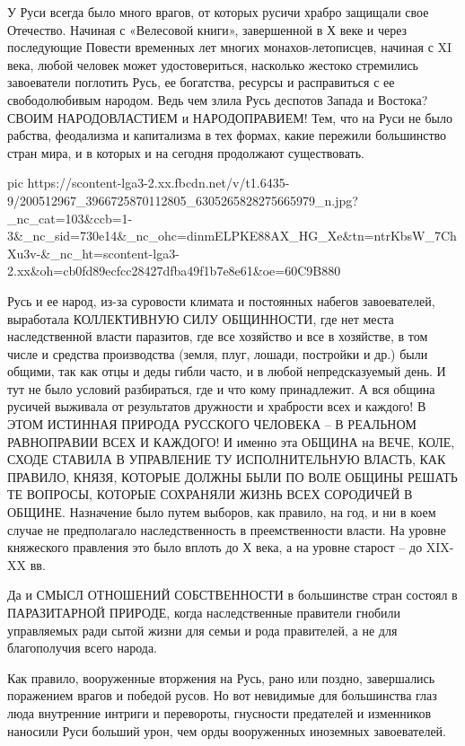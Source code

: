 У Руси всегда было много врагов, от которых русичи  храбро защищали свое
Отечество. Начиная с «Велесовой книги», завершенной в Х веке и через
последующие Повести временных лет многих монахов-летописцев, начиная с XI века,
любой человек может удостовериться, насколько жестоко стремились завоеватели
поглотить Русь, ее богатства, ресурсы и расправиться с ее свободолюбивым
народом. Ведь чем злила Русь деспотов Запада и Востока? СВОИМ НАРОДОВЛАСТИЕМ и
НАРОДОПРАВИЕМ! Тем, что на Руси не было рабства, феодализма и капитализма в тех
формах, какие пережили большинство стран мира, и в которых и на сегодня
продолжают существовать. 

\ifcmt
  pic https://scontent-lga3-2.xx.fbcdn.net/v/t1.6435-9/200512967_3966725870112805_6305265828275665979_n.jpg?_nc_cat=103&ccb=1-3&_nc_sid=730e14&_nc_ohc=dinmELPKE88AX_HG_Xe&tn=ntrKbsW_7ChXu3v-&_nc_ht=scontent-lga3-2.xx&oh=cb0fd89ecfcc28427dfba49f1b7e8e61&oe=60C9B880
\fi

Русь и ее народ, из-за суровости климата и постоянных набегов завоевателей,
выработала КОЛЛЕКТИВНУЮ СИЛУ ОБЩИННОСТИ, где нет места наследственной власти
паразитов, где все хозяйство и все в хозяйстве, в том числе и средства
производства (земля, плуг, лошади, постройки и др.) были общими, так как отцы и
деды гибли часто, и в любой непредсказуемый день. И тут не было условий
разбираться, где и что кому принадлежит. А вся община русичей выживала от
результатов дружности и храбрости всех и каждого! В ЭТОМ ИСТИННАЯ ПРИРОДА
РУССКОГО ЧЕЛОВЕКА – В РЕАЛЬНОМ РАВНОПРАВИИ ВСЕХ И КАЖДОГО! И именно эта ОБЩИНА
на ВЕЧЕ, КОЛЕ, СХОДЕ СТАВИЛА В УПРАВЛЕНИЕ ТУ ИСПОЛНИТЕЛЬНУЮ ВЛАСТЬ, КАК
ПРАВИЛО, КНЯЗЯ, КОТОРЫЕ ДОЛЖНЫ БЫЛИ ПО ВОЛЕ ОБЩИНЫ РЕШАТЬ ТЕ ВОПРОСЫ, КОТОРЫЕ
СОХРАНЯЛИ ЖИЗНЬ ВСЕХ СОРОДИЧЕЙ В ОБЩИНЕ. Назначение было путем выборов, как
правило, на год, и ни в коем случае не предполагало наследственность в
преемственности власти. На уровне княжеского правления это было вплоть до Х
века, а на уровне старост – до XIX-XX  вв.

Да и СМЫСЛ ОТНОШЕНИЙ СОБСТВЕННОСТИ в большинстве стран состоял в ПАРАЗИТАРНОЙ
ПРИРОДЕ, когда наследственные правители гнобили управляемых ради сытой жизни
для семьи и рода правителей, а не для благополучия всего народа.

Как правило, вооруженные вторжения на Русь, рано или поздно, завершались
поражением врагов и победой русов. Но вот невидимые для большинства глаз люда
внутренние интриги и перевороты, гнусности предателей и изменников наносили
Руси больший урон, чем орды вооруженных иноземных завоевателей.

